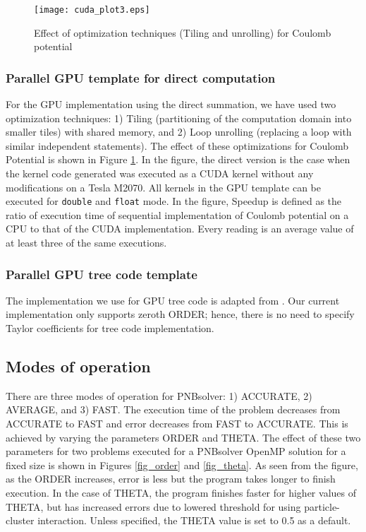 \documentclass[draftclsnofoot]{elsarticle}
\begin{document}
\begin{figure}[!t]
\centering
\texttt{[image: cuda\_plot3.eps]}
\caption{Effect of optimization techniques (Tiling and unrolling) for Coulomb potential}
\label{fig_cuda3}
\end{figure}

\subsubsection{Parallel GPU template for direct computation}
For the GPU implementation using the direct summation, we have used two optimization techniques: 1) Tiling (partitioning of the computation domain into smaller tiles) 
 with shared memory, and 2) Loop unrolling (replacing a loop with similar independent statements). The effect of these  optimizations for Coulomb Potential is shown in Figure \ref{fig_cuda3}. In the figure,  the direct version 
is the case when the kernel code generated 
 was executed as a CUDA kernel without any modifications on a Tesla M2070. All kernels in the GPU template can be executed for \texttt{double} and 
\texttt{float} mode. In the figure,  Speedup is defined as the ratio of execution time of sequential implementation of Coulomb potential on a CPU to that of the CUDA implementation.
 Every reading is an average value of at least three of the same executions.    

\subsubsection{Parallel GPU tree code template}
The implementation we use for GPU tree code is adapted from \cite{gputree}. Our current implementation only supports zeroth ORDER; hence, there is no need to specify Taylor
coefficients for tree code implementation. 


\subsection{Modes of operation}
There are three modes of operation for PNBsolver: 1) ACCURATE, 2) AVERAGE, and 3) FAST. The execution time of the problem decreases from ACCURATE to FAST and error decreases
from FAST to ACCURATE. This is achieved by varying the parameters ORDER and THETA. The effect of these two parameters for two problems executed for a PNBsolver OpenMP solution
for a fixed size is shown in Figures \ref{fig_order} and \ref{fig_theta}. As seen from the figure, as the ORDER increases, error is less but the program takes longer to finish execution.  
In the case of THETA, the program finishes faster for higher values of THETA, but has increased errors due to lowered threshold for using particle-cluster interaction. 
Unless specified, the THETA value is set to 0.5 as a default. 
\end{document}
